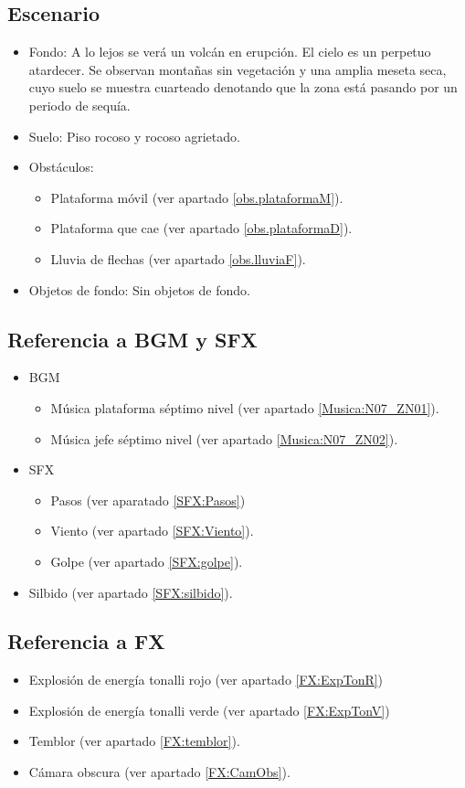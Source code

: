 	\subsection{Escenario}
\begin{itemize} 
	\item Fondo: A lo lejos se verá un volcán en erupción. El cielo es un perpetuo atardecer. Se observan montañas sin vegetación y una amplia meseta seca, cuyo suelo se muestra cuarteado denotando que la zona está pasando por un periodo de sequía. 
	\item Suelo: Piso rocoso y rocoso agrietado.
	\item Obstáculos:
	\begin{itemize}
	\item Plataforma móvil (ver apartado \ref{obs.plataformaM}).
			\item Plataforma que cae (ver apartado \ref{obs.plataformaD}).
			\item Lluvia de flechas (ver apartado \ref{obs.lluviaF}).
\end{itemize}	 
	
	\item Objetos de fondo: Sin objetos de fondo.
\end{itemize}	
	\subsection{Referencia a BGM y SFX}
	\begin{itemize}
		\item BGM
			\begin{itemize}
				\item Música plataforma séptimo nivel (ver apartado \ref{Musica:N07_ZN01}).
				\item Música jefe séptimo nivel (ver apartado \ref{Musica:N07_ZN02}).
			\end{itemize}
		\item SFX
			\begin{itemize}
				\item Pasos (ver aparatado \ref{SFX:Pasos})
				\item Viento (ver apartado \ref{SFX:Viento}).
				\item Golpe (ver apartado \ref{SFX:golpe}).
			\end{itemize}
			\item Silbido (ver apartado \ref{SFX:silbido}).
	\end{itemize}
	\subsection{Referencia a FX}
	\begin{itemize}
		\item Explosión de energía tonalli rojo (ver apartado \ref{FX:ExpTonR})
	\item Explosión de energía tonalli verde (ver apartado \ref{FX:ExpTonV})
	\item Temblor (ver apartado \ref{FX:temblor}).
	\item Cámara obscura (ver apartado \ref{FX:CamObs}).
	\end{itemize}
	